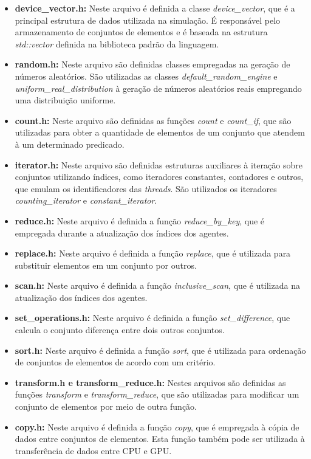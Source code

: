\begin{itemize}
 \item \textbf{device\_vector.h:} Neste arquivo é definida a classe \textit{device\_vector}, que é a principal estrutura de dados utilizada na simulação. É responsável pelo armazenamento de conjuntos de elementos e é baseada na estrutura \textit{std::vector} definida na biblioteca padrão da linguagem. 
 \item \textbf{random.h:} Neste arquivo são definidas classes empregadas na geração de números aleatórios. São utilizadas as classes \textit{default\_random\_engine} e \textit{uniform\_real\_distribution} à geração de números aleatórios reais empregando uma distribuição uniforme. 
 \item \textbf{count.h:} Neste arquivo são definidas as funções \textit{count} e \textit{count\_if}, que são utilizadas para obter a quantidade de elementos de um conjunto que atendem à um determinado predicado. 
 \item \textbf{iterator.h:} Neste arquivo são definidas estruturas auxiliares à iteração sobre conjuntos utilizando índices, como iteradores constantes, contadores e outros, que emulam os identificadores das \textit{threads}. São utilizados os iteradores \textit{counting\_iterator} e \textit{constant\_iterator}. 
 \item \textbf{reduce.h:} Neste arquivo é definida a função \textit{reduce\_by\_key}, que é empregada durante a atualização dos índices dos agentes. 
 \item \textbf{replace.h:} Neste arquivo é definida a função \textit{replace}, que é utilizada para substituir elementos em um conjunto por outros. 
 \item \textbf{scan.h:} Neste arquivo é definida a função \textit{inclusive\_scan}, que é utilizada na atualização dos índices dos agentes. 
 \item \textbf{set\_operations.h:} Neste arquivo é definida a função \textit{set\_difference}, que calcula o conjunto diferença entre dois outros conjuntos. 
 \item \textbf{sort.h:} Neste arquivo é definida a função \textit{sort}, que é utilizada para ordenação de conjuntos de elementos de acordo com um critério. 
 \item \textbf{transform.h e transform\_reduce.h:} Nestes arquivos são definidas as funções \textit{transform} e \textit{transform\_reduce}, que são utilizadas para modificar um conjunto de elementos por meio de outra função. 
 \item \textbf{copy.h:} Neste arquivo é definida a função \textit{copy}, que é empregada à cópia de dados entre conjuntos de elementos. Esta função também pode ser utilizada à transferência de dados entre CPU e GPU. 

\end{itemize}

